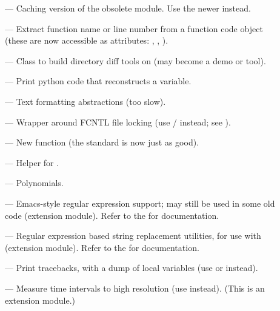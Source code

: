 \begin{description}
\begin{description}
\item[]
--- Caching version of the obsolete  module.  Use the
newer  instead.

\item[]
--- Extract function name or line number from a function
code object (these are now accessible as attributes:
, ,
).

\item[]
--- Class to build directory diff tools on (may become a demo or tool).

\item[]
--- Print python code that reconstructs a variable.

\item[]
--- Text formatting abstractions (too slow).

\item[]
--- Wrapper around FCNTL file locking (use
/ instead; see ).

\item[]
--- New  function (the standard  is
now just as good).

\item[]
--- Helper for .

\item[]
--- Polynomials.

\item[]
--- Emacs-style regular expression support; may still be used in some
old code (extension module).  Refer to the
 for documentation.

\item[]
--- Regular expression based string replacement utilities, for use
with  (extension module).  Refer to the
 for documentation.

\item[]
--- Print tracebacks, with a dump of local variables (use
 or  instead).

\item[]
--- Measure time intervals to high resolution (use
 instead).  (This is an extension module.)


\end{description}
\end{description}

